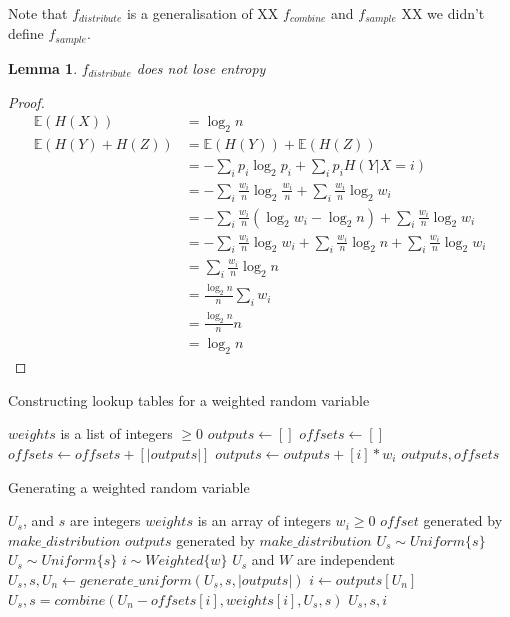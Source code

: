 \documentclass[12pt]{article}
\newtheorem{lemma}{Lemma}
\begin{document}
Note that $f_{distribute}$ is a generalisation of XX $f_{combine}$ and $f_{sample}$ XX we didn't define $f_{sample}$.

\begin{lemma}
    \label{lem:distribution-conservation}
    $f_{distribute}$ does not lose entropy
\end{lemma}

\begin{proof}
    \begin{align}
    \mathbb{E}(H(X)) & = \log_2 n \\
    \mathbb{E}(H(Y) + H(Z)) &=  \mathbb{E}(H(Y)) + \mathbb{E}(H(Z)) \\
               & = - \sum_i p_i \log_2p_i + \sum_i p_iH(Y|X=i) \\
               & = - \sum_i \frac{w_i}{n} \log_2 \frac{w_i}{n} + \sum_i \frac{w_i}{n}\log_2 w_i \\
               & = - \sum_i \frac{w_i}{n}(\log_2 w_i - \log_2 n) + \sum_i \frac{w_i}{n}\log_2 w_i \\
               & = - \sum_i \frac{w_i}{n}\log_2 w_i + \sum_i \frac{w_i}{n} \log_2 n + \sum_i \frac{w_i}{n}\log_2 w_i \\
               & = \sum_i \frac{w_i}{n} \log_2 n \\
               & = \frac{\log_2 n}{n} \sum_i w_i \\
               & = \frac{\log_2 n}{n} n \\
               & = \log_2 n
    \end{align}
\end{proof}

\begin{algorithm}
\caption{Constructing lookup tables for a weighted random variable}
\label{alg:generate-lookup-tables}
\begin{algorithmic}[1]
\Require $weights$ is a list of integers $\ge0$
  \State $outputs \gets []$
  \State $offsets \gets []$
    \State $offsets \gets offsets + [|outputs|]$
    \State $outputs \gets outputs + [i] * w_i$
  \EndFor
  \State \Return $outputs, offsets$
\EndProcedure
\end{algorithmic}
\end{algorithm}


\begin{algorithm}
\caption{Generating a weighted random variable}
\label{alg:generate-distribution}
\begin{algorithmic}[1]
\Require $U_s$, and $s$ are integers
\Require $weights$ is an array of integers $w_i \ge 0$
\Require $offset$ generated by $make\_distribution$ 
\Require $outputs$ generated by $make\_distribution$
\Require $U_s \sim Uniform\{s\}$
\Ensure $U_s \sim Uniform\{s\}$
\Ensure $i \sim Weighted\{w\}$
\Ensure $U_s$ and $W$ are independent
    \State $U_s, s, U_n \gets generate\_uniform(U_s, s, |outputs|)$
    \State $i \gets outputs[U_n]$
    \State $U_s, s = combine(U_n - offsets[i], weights[i], U_s, s)$
    \State \Return $U_s, s, i$
\EndProcedure
\end{algorithmic}
\end{algorithm}
\end{document}

